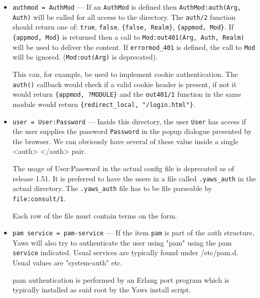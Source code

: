 \documentclass[11pt,oneside,english]{book}
\begin{document}
\begin{itemize}
\begin{itemize}
              \item \verb+authmod = AuthMod+ --- If an \verb+AuthMod+ is defined
                then \verb+AuthMod:auth(Arg, Auth)+ will be called for all
                access to the directory. The \verb+auth/2+ function should
                return one of: \verb+true+, \verb+false+, \verb+{false, Realm}+,
                \verb+{appmod, Mod}+. If \verb+{appmod, Mod}+ is returned then a
                call to \verb+Mod:out401(Arg, Auth, Realm)+ will be used to
                deliver the content. If \verb+errormod_401+ is defined, the call
                to \verb+Mod+ will be ignored. (\verb+Mod:out(Arg)+ is
                deprecated).

                This can, for example, be used to implement cookie
                authentication. The \verb+auth()+ callback would check if a
                valid cookie header is present, if not it would return
                \verb+{appmod, ?MODULE}+ and the \verb+out401/1+ function in the
                same module would return \verb+{redirect_local, "/login.html"}+.

              \item \verb+user = User:Password+ --- Inside this directory, the
                user \verb+User+ has access if the user supplies the password
                \verb+Password+ in the popup dialogue presented by the browser.
                We can obviously have several of these value inside a single
                <auth> </auth> pair.

                The usage of User:Password in the actual config file is
                deprecated as of release 1.51. It is preferred to have the users
                in a file called \verb+.yaws_auth+ in the actual directory. The
                \verb+.yaws_auth+ file has to be file parseable by
                \verb+file:consult/1+.

                Each row of the file must contain terms on the form.

              \item \verb+pam service = pam-service+ --- If the item \verb+pam+
                is part of the auth structure, Yaws will also try to
                authenticate the user using "pam" using the pam \verb+service+
                indicated. Usual services are typically found under
                /etc/pam.d. Usual values are "system-auth" etc.

                pam authentication is performed by an Erlang port program which
                is typically installed as suid root by the Yaws install script.


\end{itemize}
\end{itemize}
\end{document}
